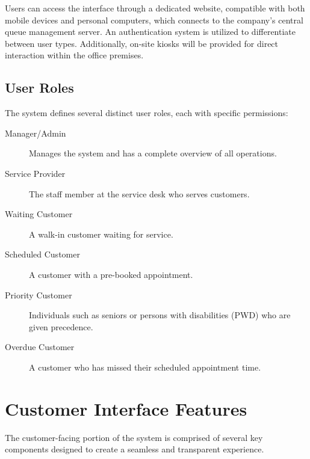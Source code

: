 \documentclass[12pt,a4paper]{report}
\begin{document}
Users can access the interface through a dedicated website, compatible with both mobile devices and personal computers, which connects to the company's central queue management server. An authentication system is utilized to differentiate between user types. Additionally, on-site kiosks will be provided for direct interaction within the office premises.

\subsection{User Roles}

The system defines several distinct user roles, each with specific permissions:

\begin{description}
    \item[Manager/Admin] Manages the system and has a complete overview of all operations.
    \item[Service Provider] The staff member at the service desk who serves customers.
    \item[Waiting Customer] A walk-in customer waiting for service.
    \item[Scheduled Customer] A customer with a pre-booked appointment.
    \item[Priority Customer] Individuals such as seniors or persons with disabilities (PWD) who are given precedence.
    \item[Overdue Customer] A customer who has missed their scheduled appointment time.
\end{description}

\section{Customer Interface Features}

The customer-facing portion of the system is comprised of several key components designed to create a seamless and transparent experience.
\end{document}
